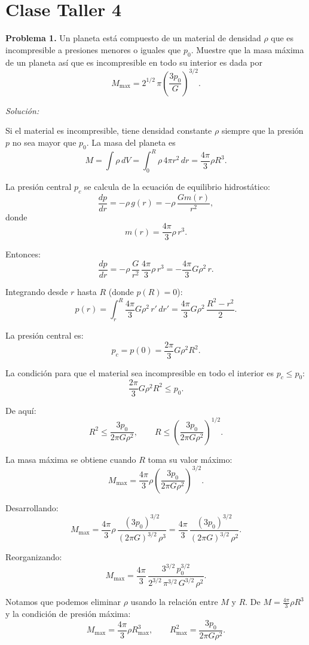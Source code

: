 \chapter{Clase Taller 4}

\noindent\textbf{Problema 1.} Un planeta está compuesto de un material de densidad $\rho$ que es incompresible a presiones menores o iguales que $p_0$. Muestre que la masa máxima de un planeta así que es incompresible en todo su interior es dada por
$$
M_{\text{max}} = 2^{1/2}\,\pi\left(\frac{3p_0}{G}\right)^{3/2}.
$$

\vspace{0.5em}

\noindent\textit{Solución:}

Si el material es incompresible, tiene densidad constante $\rho$ siempre que la presión $p$ no sea mayor que $p_0$. La masa del planeta es
$$
M = \int \rho\, dV = \int_0^R \rho\, 4\pi r^2\, dr = \frac{4\pi}{3}\rho R^3.
$$

La presión central $p_c$ se calcula de la ecuación de equilibrio hidrostático:
$$
\frac{dp}{dr} = -\rho\, g(r) = -\rho\,\frac{Gm(r)}{r^2},
$$
donde
$$
m(r) = \frac{4\pi}{3}\rho\, r^3.
$$

Entonces:
$$
\frac{dp}{dr} = -\rho\,\frac{G}{r^2}\,\frac{4\pi}{3}\rho\, r^3 = -\frac{4\pi}{3}G\rho^2\, r.
$$

Integrando desde $r$ hasta $R$ (donde $p(R) = 0$):
$$
p(r) = \int_r^R \frac{4\pi}{3}G\rho^2\, r'\, dr' = \frac{4\pi}{3}G\rho^2\,\frac{R^2 - r^2}{2}.
$$

La presión central es:
$$
p_c = p(0) = \frac{2\pi}{3}G\rho^2 R^2.
$$

La condición para que el material sea incompresible en todo el interior es $p_c \leq p_0$:
$$
\frac{2\pi}{3}G\rho^2 R^2 \leq p_0.
$$

De aquí:
$$
R^2 \leq \frac{3p_0}{2\pi G\rho^2}, \qquad R \leq \left(\frac{3p_0}{2\pi G\rho^2}\right)^{1/2}.
$$

La masa máxima se obtiene cuando $R$ toma su valor máximo:
$$
M_{\text{max}} = \frac{4\pi}{3}\rho\left(\frac{3p_0}{2\pi G\rho^2}\right)^{3/2}.
$$

Desarrollando:
$$
M_{\text{max}} = \frac{4\pi}{3}\rho\,\frac{(3p_0)^{3/2}}{(2\pi G)^{3/2}\,\rho^3} = \frac{4\pi}{3}\,\frac{(3p_0)^{3/2}}{(2\pi G)^{3/2}\,\rho^2}.
$$

Reorganizando:
$$
M_{\text{max}} = \frac{4\pi}{3}\,\frac{3^{3/2}\,p_0^{3/2}}{2^{3/2}\,\pi^{3/2}\,G^{3/2}\,\rho^2}.
$$

Notamos que podemos eliminar $\rho$ usando la relación entre $M$ y $R$. De $M = \frac{4\pi}{3}\rho R^3$ y la condición de presión máxima:
$$
M_{\text{max}} = \frac{4\pi}{3}\rho R_{\text{max}}^3, \qquad R_{\text{max}}^2 = \frac{3p_0}{2\pi G\rho^2}.
$$

